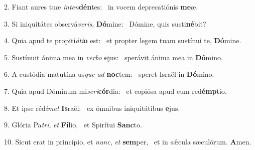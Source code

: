 2. Fiant aures tuæ \textit{in}\textit{ten}\textbf{dén}tes: \ast\  in vocem deprecatiónis \textbf{me}æ.\

3. Si iniquitátes observá\textit{ve}\textit{ris}, \textbf{Dó}mine: \ast\  Dómine, quis susti\textbf{né}bit?\

4. Quia apud te propiti\textit{á}\textit{ti}\textbf{o} est: \ast\  et propter legem tuam sustínui te, \textbf{Dó}mine.\

5. Sustínuit ánima mea in \textit{ver}\textit{bo} \textbf{e}jus: \ast\  sperávit ánima mea in \textbf{Dó}mino.\

6. A custódia matutína us\textit{que} \textit{ad} \textbf{noc}tem: \ast\  speret Israël in \textbf{Dó}mino.\

7. Quia apud Dóminum mi\textit{se}\textit{ri}\textbf{cór}dia: \ast\  et copiósa apud eum red\textbf{émp}tio.\

8. Et ipse réd\textit{i}\textit{met} \textbf{Is}raël: \ast\  ex ómnibus iniquitátibus \textbf{e}jus.\

9. Glória Pa\textit{tri}, \textit{et} \textbf{Fí}lio, \ast\  et Spirítui \textbf{Sanc}to.\

10. Sicut erat in princípio, et \textit{nunc}, \textit{et} \textbf{sem}per, \ast\  et in sǽcula sæculórum. \textbf{A}men.\

